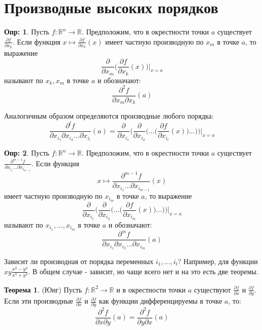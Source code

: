 \documentclass[12pt]{article}
\newcommand{\MR}{\mathbb{R}}
\theoremstyle{definition}
\newtheorem{defn}{Опр:}
\newtheorem{theorem}{Теорема}
\begin{document}
\section*{Производные высоких порядков}
\begin{defn}
	Пусть $f\colon \MR^n \to \MR$. Предположим, что в окрестности точки $a$ существует $\tfrac{\partial f}{\partial x_k}$. Если функция $x \mapsto \tfrac{\partial f}{\partial x_k}(x)$ имеет частную производную по $x_m$ в точке $a$, то выражение 
	$$
		\dfrac{\partial}{\partial x_m} \bigg(\dfrac{\partial f}{\partial x_k}(x)\bigg)\bigg|_{x= a}
	$$ 
	называют  по $x_k, x_m$ в точке $a$ и обозначают:
	$$
		\dfrac{\partial^2 f}{\partial x_m \partial x_k}(a)
	$$
\end{defn}
Аналогичным образом определяются производные любого порядка:
$$
	\dfrac{\partial^l f}{\partial x_{i_1}\partial x_{i_2}\dotsc \partial x_{i_l}}(a) = \dfrac{\partial}{\partial x_{i_1}}\bigg(\dfrac{\partial}{\partial x_{i_2}}\bigg(\dotsc \bigg(\dfrac{\partial f}{\partial x_{i_l}}(x)\bigg)\dotsc\bigg) \bigg)\bigg|_{x=a}
$$
\begin{defn}
	Пусть $f\colon \MR^n \to \MR$. Предположим, что в окрестности точки $a$ существует $\tfrac{\partial^{m-1} f}{\partial x_{i_1}\dotsc \partial x_{i_{m-1}}}$. Если функция 
	$$
		x \mapsto \dfrac{\partial^{m-1} f}{\partial x_{i_1}\dotsc \partial x_{i_{m-1}}}(x)
	$$ 
	имеет частную производную по $x_{i_m}$ в точке $a$, то выражение 
	$$ 
		\dfrac{\partial}{\partial x_{i_1}}\bigg(\dfrac{\partial}{\partial x_{i_2}}\bigg(\dotsc \bigg(\dfrac{\partial f}{\partial x_{i_m}}(x)\bigg)\dotsc\bigg) \bigg)\bigg|_{x = a}
	$$
	называют  по $x_{i_1},\dotsc, x_{i_m}$ в точке $a$ и обозначают:
	$$
		\dfrac{\partial^m f}{\partial x_{i_1}\partial x_{i_2}\dotsc \partial x_{i_m}}(a)
	$$
\end{defn}
Зависит ли производная от порядка переменных $i_1, \dotsc, i_l$? Например, для функции $xy\tfrac{x^2 - y^2}{x^2 + y^2}$. В общем случае - зависит, но чаще всего нет и на это есть две теоремы.
\begin{theorem}(Юнг)
	Пусть $f\colon \MR^2 \to \MR$ и в окрестности точки $a$ существуют $\tfrac{\partial f}{\partial x}$ и $\tfrac{\partial f}{\partial y}$. Если эти производные $\tfrac{\partial f}{\partial x}$ и $\tfrac{\partial f}{\partial y}$ как функции дифференцируемы в точке $a$, то:
	$$
		\dfrac{\partial^2 f}{\partial x \partial y}(a) = \dfrac{\partial^2 f}{\partial y \partial x}(a)
	$$
\end{theorem}
\end{document}
